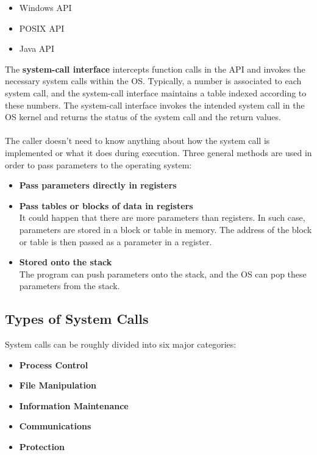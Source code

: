 \documentclass{article}
\begin{document}
\begin{itemize}
	\item Windows API
	\item POSIX API
	\item Java API
\end{itemize}
The \textbf{system-call interface} intercepts function calls in the API and invokes the necessary system calls within the OS. Typically, a number is associated to each system call, and the system-call interface maintains a table indexed according to these numbers. The system-call interface invokes the intended system call in the OS kernel and returns the status of the system call and the return values. \\ \\
The caller doesn't need to know anything about how the system call is implemented or what it does during execution. Three general methods are used in order to pass parameters to the operating system:
\begin{itemize}
	\item \textbf{Pass parameters directly in registers}
	\item \textbf{Pass tables or blocks of data in registers}
	\vspace{.2cm} \\
	It could happen that there are more parameters than registers. In such case, parameters are stored in a block or table in memory. The address of the block or table is then passed as a parameter in a register.
	
	\item \textbf{Stored onto the stack}
	\vspace{.2cm} \\
	The program can push parameters onto the stack, and the OS can pop these parameters from the stack.
\end{itemize}

\subsection{Types of System Calls}
System calls can be roughly divided into six major categories:

\begin{itemize}
	\item \textbf{Process Control}
	\item \textbf{File Manipulation}
	\item \textbf{Information Maintenance}
	\item \textbf{Communications}
	\item \textbf{Protection}
\end{itemize}
\end{document}
